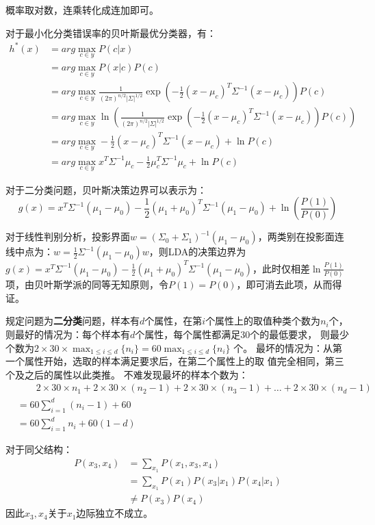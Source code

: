 \documentclass{ctexart}
\begin{document}
    \answer[7.4]
概率取对数，连乘转化成连加即可。
    

    \answer[7.5]
    对于最小化分类错误率的贝叶斯最优分类器，有：
    $$
    \begin{aligned}
        h^*(x) &= arg\max_{c\in y}P(c|x)\\
        &=arg\max_{c\in y}P(x|c)P(c)\\
        &= arg\max_{c\in y}\frac{1}{(2\pi)^{n/2}|\Sigma|^{1/2}}\exp(-\frac{1}{2}(x-\mu_c)^T\Sigma^{-1}(x-\mu_c))P(c)\\
        &= arg\max_{c\in y}\ln(\frac{1}{(2\pi)^{n/2}|\Sigma|^{1/2}}\exp(-\frac{1}{2}(x-\mu_c)^T\Sigma^{-1}(x-\mu_c))P(c))\\
        &= arg\max_{c\in y}-\frac{1}{2}(x-\mu_c)^T\Sigma^{-1}(x-\mu_c)+\ln P(c)\\
        &= arg\max_{c\in y}x^T\Sigma^{-1}\mu_c-\frac{1}{2}\mu_c^T\Sigma^{-1}\mu_c+\ln P(c)
    \end{aligned}
    $$

    对于二分类问题，贝叶斯决策边界可以表示为：
    $$
    g(x) = x^T\Sigma^{-1}(\mu_1-\mu_0)-\frac{1}{2}(\mu_1+\mu_0)^T\Sigma^{-1}(\mu_1-\mu_0)+\ln(\frac{P(1)}{P(0)})
    $$

    对于线性判别分析，投影界面$w=(\Sigma_0+\Sigma_1)^{-1}(\mu_1-\mu_0)$，两类别在投影面连线中点为：$w=\frac{1}{2}\Sigma^{-1}(\mu_1-\mu_0)w$，则LDA的决策边界为$g(x)=x^T\Sigma^{-1}(\mu_1-\mu_0)-\frac{1}{2}(\mu_1+\mu_0)^T\Sigma^{-1}(\mu_1-\mu_0)$，此时仅相差$\ln\frac{P(1)}{P(0)}$项，由贝叶斯学派的同等无知原则，令$P(1)=P(0)$，即可消去此项，从而得证。


    \answer[7.7]
规定问题为\textbf{二分类}问题，样本有$d$个属性，在第$i$个属性上的取值种类个数为$n_i$个，则最好的情况为：每个样本有$d$个属性，每个属性都满足30个的最低要求，
则最少个数为$2\times 30\times\max_{1\leq i\leq d}\{n_i\}= 60\max_{1\leq i\leq d}\{n_i\}$
个。
最坏的情况为：从第一个属性开始，选取的样本满足要求后，在第二个属性上的取
值完全相同，第三个及之后的属性以此类推。
不难发现最坏的样本个数为：
$$
\begin{aligned}
    & \qquad 2\times 30\times n_1 + 2\times 30\times(n_2 - 1) + 2\times 30\times (n_3 - 1) + \dots + 2\times 30 \times (n_d - 1)\\
    & = 60\sum_{i=1}^d(n_i - 1) +60\\
    & = 60\sum_{i=1}^dn_i + 60(1-d)
\end{aligned}
$$

    \answer[7.8]
    对于同父结构：
    $$
\begin{aligned}
    P(x_3,x_4) & = \sum_{x_1}P(x_1,x_3,x_4)\\
               & = \sum_{x_1}P(x_1)P(x_3|x_1)P(x_4|x_1)\\
               & \neq P(x_3)P(x_4)    
\end{aligned}
$$
因此$x_3,x_4$关于$x_1$边际独立不成立。
\end{document}
